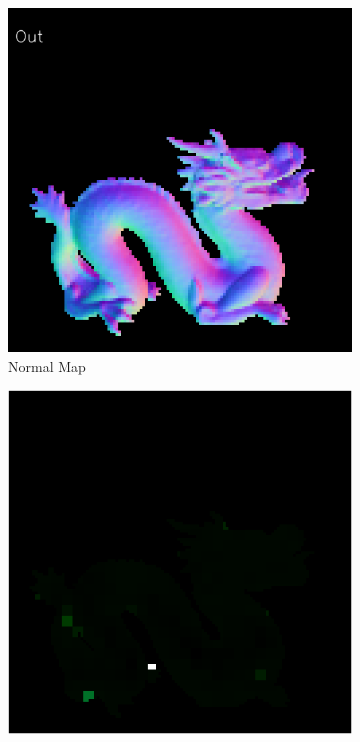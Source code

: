 \begin{figure}[H]
	\centering
	\captionsetup{width=\linewidth}
	\begin{subfigure}[b]{0.19\linewidth}
		\includegraphics[width=\linewidth]{./Figures/feature_map_gcnn/feature_map_out_gcnn-gcnn.png}
		\caption{Normal Map}
	\end{subfigure}
	\begin{subfigure}[b]{0.19\linewidth}
		\includegraphics[width=\linewidth]{./Figures/feature_map_gcnn/feature_map_gcnn-gcnn_4.png}

\end{subfigure}
\end{figure}
